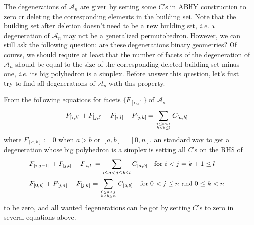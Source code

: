 \documentclass[hidelinks,12pt]{article}
\begin{document}
The degenerations of $\mathscr A_n$ are given by setting some $C$'s in ABHY construction to zero or deleting the corresponding elements in the building set. Note that the building set after deletion doesn't need to be a new building set, \emph{i.e.} a degeneration of $\mathscr A_n$ may not be a generalized permutohedron. However, we can still ask the following question: are these degenerations binary geometries? 
Of course, we should require at least that the number of facets of the degeneration of $\mathscr A_n$ should be equal to the size of the corresponding deleted building set minus one, \emph{i.e.} its big polyhedron is a simplex.
Before answer this question, let's first try to find all degenerations of $\mathscr A_n$ with this property.


From the following equations for facets $\{F_{[i,j]}\}$ of $\mathscr A_n$
\[
	F_{[i,k]}+F_{[j,l]}-F_{[i,l]}-F_{[j,k]}=
	\sum_{i\leq a<j\atop{k<b\leq l}} C_{[a,b]} 
\]
where $F_{[a,b]}:=0$ when $a>b$ or $[a,b]=[0,n]$,
an standard way to get a degeneration whose big polyhedron is a simplex is setting all $C$'s on the RHS of 
\begin{align}
&F_{[i,j-1]}+F_{[j,l]}-F_{[i,l]}= \sum_{i\leq a<j\leq b\leq l} C_{[a,b]} 
\quad \text{for $i<j=k+1\leq l$ }\\\nonumber
&F_{[0,k]}+F_{[j,n]}-F_{[j,k]}= \sum_{0\leq a<j\atop{k<b\leq n}} C_{[a,b]} 
\quad \text{for $0<j\leq n$ and $0\leq k<n$}
\end{align}
to be zero, and all wanted degenerations can be got by setting $C$'s to zero in several equations above. 
\end{document}

